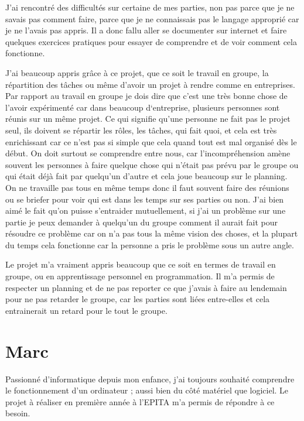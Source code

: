 \documentclass[11pt]{report}
\begin{document}
J’ai rencontré des difficultés sur certaine de mes parties, non pas parce que je ne savais pas comment faire, parce que je ne connaissais pas le langage approprié car je ne l’avais pas appris. Il a donc fallu aller se documenter sur internet et faire quelques exercices pratiques pour essayer de comprendre et de voir comment cela fonctionne.

J’ai beaucoup appris grâce à ce projet, que ce soit le travail en groupe, la répartition des tâches ou même d’avoir un projet à rendre comme en entreprises. Par rapport au travail en groupe je dois dire que c’est une très bonne chose de l’avoir expérimenté car dans beaucoup d‘entreprise, plusieurs personnes sont réunis sur un même projet. Ce qui signifie qu’une personne ne fait pas le projet seul, ils doivent se répartir les rôles, les tâches, qui fait quoi, et cela est très enrichissant car ce n’est pas si simple que cela quand tout est mal organisé dès le début. On doit surtout se comprendre entre nous, car l’incompréhension amène souvent les personnes à faire quelque chose qui n’était pas prévu par le groupe ou qui était déjà fait par quelqu’un d’autre et cela joue beaucoup sur le planning. On ne travaille pas tous en même temps donc il faut souvent faire des réunions ou se briefer pour voir qui est dans les temps sur ses parties ou non. J’ai bien aimé le fait qu’on puisse s’entraider mutuellement, si j’ai un problème sur une partie je peux demander à quelqu’un du groupe comment il aurait fait pour résoudre ce problème car on n’a pas tous la même vision des choses, et la plupart du temps cela fonctionne car la personne a pris le problème sous un autre angle.

Le projet m’a vraiment appris beaucoup que ce soit en termes de travail en groupe, ou en apprentissage personnel en programmation. Il m’a permis de respecter un planning et de ne pas reporter ce que j’avais à faire au lendemain pour ne pas retarder le groupe, car les parties sont liées entre-elles et cela entrainerait un retard pour le tout le groupe. 


\section{Marc}

Passionné d’informatique depuis mon enfance, j’ai toujours souhaité comprendre le fonctionnement d’un ordinateur ; aussi bien du côté matériel que logiciel. Le projet à réaliser en première année à l’EPITA m’a permis de répondre à ce besoin.
\end{document}
